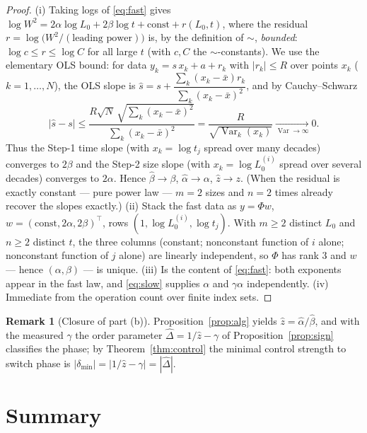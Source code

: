 \documentclass{amsart}
\theoremstyle{definition}
\newtheorem{remark}{Remark}
\newcommand{\asymp}{\sim}
\begin{document}
\begin{proof}
(i) Taking logs of \eqref{eq:fast} gives
$\log W^2=2\alpha\log L_0+2\beta\log t+\text{const}+r(L_0,t)$, where the residual
$r=\log\bigl(W^2/(\text{leading power})\bigr)$ is, by the definition of $\asymp$,
\emph{bounded}: $\log c\le r\le\log C$ for all large $t$ (with $c,C$ the
$\asymp$-constants). We use the elementary OLS bound: for data $y_k=s\,x_k+a+r_k$
with $|r_k|\le R$ over points $x_k$ ($k=1,\dots,N$), the OLS slope is
$\hat s=s+\dfrac{\sum_k(x_k-\bar x)r_k}{\sum_k(x_k-\bar x)^2}$, and by
Cauchy--Schwarz
\[
   |\hat s-s|\le\frac{R\sqrt N\,\sqrt{\sum_k(x_k-\bar x)^2}}{\sum_k(x_k-\bar x)^2}
   =\frac{R}{\sqrt{\operatorname{Var}_k(x_k)}}\xrightarrow[\operatorname{Var}\to\infty]{}0 .
\]
Thus the Step-1 time slope (with $x_k=\log t_j$ spread over many decades) converges
to $2\beta$ and the Step-2 size slope (with $x_k=\log L_0^{(i)}$ spread over several
decades) converges to $2\alpha$. Hence $\hat\beta\to\beta$, $\hat\alpha\to\alpha$,
$\hat z\to z$. (When the residual is exactly constant — pure power law — $m=2$ sizes
and $n=2$ times already recover the slopes exactly.)
(ii) Stack the fast data as $y=\Phi w$, $w=(\text{const},2\alpha,2\beta)^\top$, rows
$(1,\log L_0^{(i)},\log t_j)$. With $m\ge2$ distinct $L_0$ and $n\ge2$ distinct $t$,
the three columns (constant; nonconstant function of $i$ alone; nonconstant function
of $j$ alone) are linearly independent, so $\Phi$ has rank $3$ and $w$ — hence
$(\alpha,\beta)$ — is unique.
(iii) Is the content of \eqref{eq:fast}: both exponents appear in the fast law, and
\eqref{eq:slow} supplies $\alpha$ and $\gamma\alpha$ independently.
(iv) Immediate from the operation count over finite index sets.
\end{proof}

\begin{remark}[Closure of part (b)]
Proposition~\ref{prop:alg} yields $\hat z=\hat\alpha/\hat\beta$, and with the
measured $\gamma$ the order parameter $\widehat\Delta=1/\hat z-\gamma$ of
Proposition~\ref{prop:sign} classifies the phase; by Theorem~\ref{thm:control} the
minimal control strength to switch phase is
$|\delta_{\min}|=|1/\hat z-\gamma|=|\widehat\Delta|$.
\end{remark}

\section{Summary}
\end{document}
